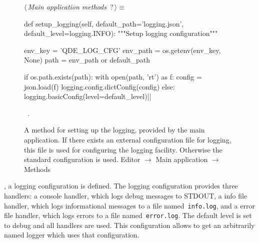\documentclass[%
    a4paper,    %
    justified,  %
    nobib,      %
    openany     %
]{tufte-book}
\makeatletter
\renewcommand{\label}[1]{\@tufte@label{##1}}%
\makeatother
\begin{document}
\begin{figure}
\begin{flushleft} \small
\begin{minipage}{\linewidth}\label{scrap55}\raggedright\small
{} $\langle\,${\itshape Main application methods}\nobreak\ {\footnotesize {?}}$\,\rangle\equiv$
\vspace{-1ex}
\begin{pythoncode}
def setup_logging(self,
                  default_path='logging.json',
                  default_level=logging.INFO):
    """Setup logging configuration"""

    env_key  = 'QDE_LOG_CFG'
    env_path = os.getenv(env_key, None)
    path     = env_path or default_path

    if os.path.exists(path):
        with open(path, 'rt') as f:
            config = json.load(f)
            logging.config.dictConfig(config)
    else:
        logging.basicConfig(level=default_level)|\NWsep|
\end{pythoncode}
\vspace{1.5ex}
\footnotesize
\begin{list}{}{\setlength{\itemsep}{-\parsep}\setlength{\itemindent}{-\leftmargin}}
\item \NWtxtMacroRefIn\ .

\item{}
\end{list}
\end{minipage}\vspace{4ex}
\end{flushleft}
\caption{A method for setting up the logging, provided by the main application.
  If there exists an external configuration file for logging, this file is used
  for configuring the logging facility. Otherwise the standard configuration is
  used.
  \newline{}\newline{}Editor $\rightarrow$ Main application
  $\rightarrow$ Methods}
\label{logging:lst:main-application:methods:setup-logging}
\end{figure}

, a logging
configuration is defined. The logging configuration provides three handlers: a
console handler, which logs debug messages to STDOUT, a info file handler, which
logs informational messages to a file named~\verb=info.log=, and a error file
handler, which logs errors to a file named~\verb=error.log=. The default level
is set to debug and all handlers are used. This configuration allows to get an
arbitrarily named logger which uses that configuration.
\end{document}
